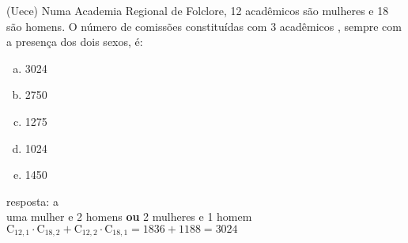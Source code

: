 \begin{ex}
 (Uece) Numa Academia Regional de Folclore, 12 acadêmicos são mulheres e 18 são homens. O número de comissões constituídas com 3 acadêmicos , sempre com a presença dos dois sexos, é:
   \begin{enumerate}[(a)]
   \item 3024
   \item 2750
   \item 1275
   \item 1024
   \item 1450
   \end{enumerate}
     \begin{sol}
       resposta: a \\
       uma mulher e 2 homens \textbf{ou} 2 mulheres e 1 homem $\mathrm{C}_{{12},1}\cdot\mathrm{C}_{{18},2}+\mathrm{C}_{{12},2}\cdot\mathrm{C}_{{18},1}=1836+1188=3024$
     \end{sol}
\end{ex}